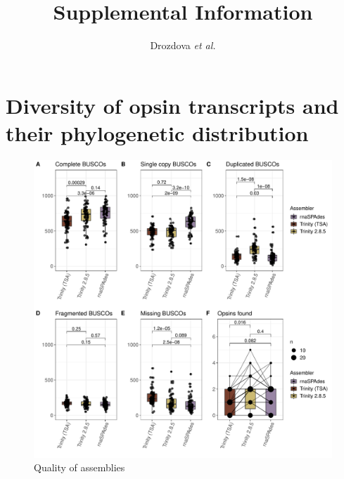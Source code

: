 \documentclass{article}
\begin{document}
	
\title{Supplemental Information} %
\author{Drozdova \textit{et al.}} %
\maketitle

\section{Diversity of opsin transcripts and their phylogenetic distribution}

\begin{figure}[H] 
\hskip -1cm \includegraphics[scale=0.8]{./FigS1_assembly_comparison.pdf}
	\caption{Quality of assemblies} \end{figure}
\end{document}
